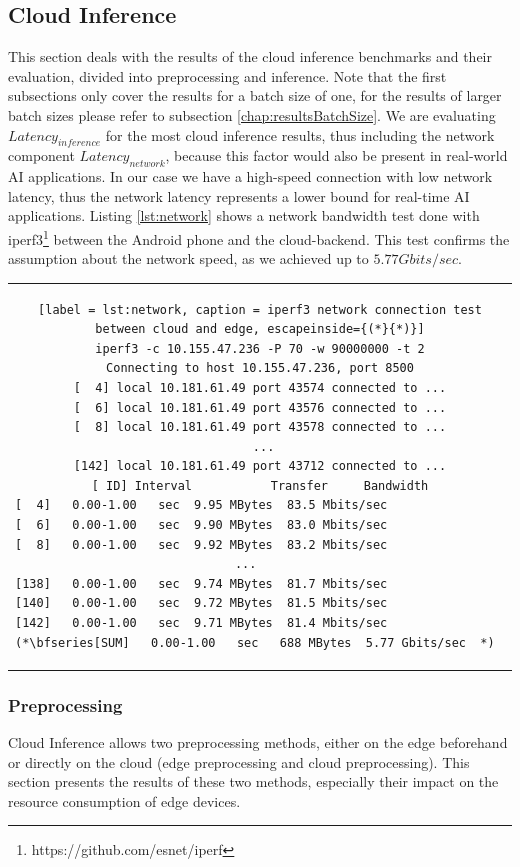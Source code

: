 \subsection{Cloud Inference}
\label{chap:CloudResults}
This section deals with the results of the cloud inference benchmarks and their evaluation, divided into preprocessing and inference.
Note that the first subsections only cover the results for a batch size of one, for the results of larger batch sizes please refer to subsection \ref{chap:resultsBatchSize}.
We are evaluating $Latency_{inference}$ for the most cloud inference results, thus including the network component $Latency_{network}$, because this factor would also be present in real-world AI applications. In our case we have a high-speed connection with low network latency, thus the network latency represents a lower bound for real-time AI applications.
Listing \ref{lst:network} shows a network bandwidth test done with iperf3\footnote{https://github.com/esnet/iperf} between the Android phone and the cloud-backend. This test confirms the assumption about the network speed, as we achieved up to $5.77 Gbits/sec$.
\begin{center}
\begin{tabular}{c}
\begin{lstlisting}[label = lst:network, caption = iperf3 network connection test between cloud and edge, escapeinside={(*}{*)}]
iperf3 -c 10.155.47.236 -P 70 -w 90000000 -t 2
Connecting to host 10.155.47.236, port 8500
[  4] local 10.181.61.49 port 43574 connected to ...
[  6] local 10.181.61.49 port 43576 connected to ...
[  8] local 10.181.61.49 port 43578 connected to ...
 ...
[142] local 10.181.61.49 port 43712 connected to ...
[ ID] Interval           Transfer     Bandwidth
[  4]   0.00-1.00   sec  9.95 MBytes  83.5 Mbits/sec                  
[  6]   0.00-1.00   sec  9.90 MBytes  83.0 Mbits/sec                  
[  8]   0.00-1.00   sec  9.92 MBytes  83.2 Mbits/sec                  
 ...     
[138]   0.00-1.00   sec  9.74 MBytes  81.7 Mbits/sec                  
[140]   0.00-1.00   sec  9.72 MBytes  81.5 Mbits/sec                  
[142]   0.00-1.00   sec  9.71 MBytes  81.4 Mbits/sec                  
(*\bfseries[SUM]   0.00-1.00   sec   688 MBytes  5.77 Gbits/sec  *)  

\end{lstlisting}
\end{tabular}
\end{center}
\subsubsection{Preprocessing}
Cloud Inference allows two preprocessing methods, either on the edge beforehand or directly on the cloud (edge preprocessing and cloud preprocessing).
This section presents the results of these two methods, especially their impact on the resource consumption of edge devices.

